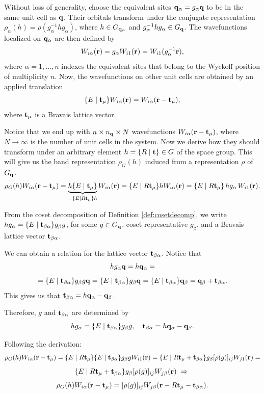 Without loss of generality, choose the equivalent sites ${\vb{q}}_\alpha = g_{\alpha} {\vb{q}}$ to be in the same unit cell as ${\vb{q}}$. Their orbitals transform under the conjugate representation $\rho_\alpha(h) = \rho(g_\alpha^{-1} h g_\alpha)$, where $h \in G_{{\vb{q}}_\alpha}$ and $g_\alpha^{-1} h g_\alpha \in G_{\vb{q}}$. The wavefunctions localized on ${\vb{q}}_\alpha$ are then defined by
$$
W_{i\alpha}({\vb{r}}) = g_\alpha W_{i1}({\vb{r}}) = W_{i1}(g_\alpha^{-1} {\vb{r}}),
$$
where $\alpha = 1, \ldots, n$ indexes the equivalent sites that belong to the Wyckoff position of multiplicity $n$. Now, the wavefunctions on other unit cells are obtained by an applied translation
$$
\{ E \mid {\vb{t}}_\mu \} W_{i\alpha}({\vb{r}}) = W_{i\alpha}({\vb{r}}-{\vb{t}}_\mu),
$$
where ${\vb{t}}_\mu$ is a Bravais lattice vector.

Notice that we end up with $n \times n_{\vb{q}} \times N$ wavefunctions $W_{i\alpha}({\vb{r}}-{\vb{t}}_\mu)$, where $N \to \infty$ is the number of unit cells in the system. Now we derive how they should transform under an arbitrary element $h = \{ R \mid {\vb{t}} \} \in G$ of the space group. This will give us the band representation $\rho_G(h)$ induced from a representation $\rho$ of $G_{\vb{q}}$.
$$
\rho_G(h) W_{i\alpha}({\vb{r}}-{\vb{t}}_\mu) =
\underbrace{h \{ E \mid {\vb{t}}_\mu \}}_{= \{ E \mid R{\vb{t}}_\mu \} h} W_{i\alpha} ({\vb{r}}) =
\{ E \mid R{\vb{t}}_\mu \} h W_{i\alpha} ({\vb{r}}) =
\{ E \mid R{\vb{t}}_\mu \} \, h g_\alpha \, W_{i1} ({\vb{r}}).
$$

From the coset decomposition of Definition \ref{def:cosetdecomp}, we write $h g_\alpha = \{ E \mid {\vb{t}}_{\beta\alpha} \} g_\beta g$, for some $g \in G_{\vb{q}}$, coset representative $g_\beta$, and a Bravais lattice vector ${\vb{t}}_{\beta\alpha}$.

We can obtain a relation for the lattice vector ${\vb{t}}_{\beta\alpha}$. Notice that
$$
h g_\alpha {\vb{q}} = h {\vb{q}}_\alpha =
$$
$$
= \{ E \mid {\vb{t}}_{\beta\alpha} \} g_\beta g {\vb{q}} = \{ E \mid {\vb{t}}_{\beta\alpha} \} g_\beta {\vb{q}} = \{ E \mid {\vb{t}}_{\beta\alpha} \} {\vb{q}}_\beta = {\vb{q}}_\beta + {\vb{t}}_{\beta\alpha}.
$$
This gives us that ${\vb{t}}_{\beta\alpha} = h {\vb{q}}_\alpha - {\vb{q}}_\beta$.

Therefore, $g$ and ${\vb{t}}_{\beta\alpha}$ are determined by
\begin{equation} \label{eq:g_and_tba}
h g_\alpha = \{ E \mid {\vb{t}}_{\beta\alpha} \} g_\beta g, \quad {\vb{t}}_{\beta\alpha} = h {\vb{q}}_\alpha - {\vb{q}}_\beta.
\end{equation}

Following the derivation:
$$
\rho_G(h) W_{i\alpha}({\vb{r}}-{\vb{t}}_\mu) =
\{ E \mid R{\vb{t}}_\mu \} \{ E \mid {\vb{t}}_{\beta\alpha} \} g_\beta g W_{i1}({\vb{r}}) =
\{ E \mid R{\vb{t}}_\mu + {\vb{t}}_{\beta\alpha} \} g_\beta [\rho(g)]_{ij} W_{j1}({\vb{r}}) =
$$
$$
\{ E \mid R{\vb{t}}_\mu + {\vb{t}}_{\beta\alpha} \} g_\beta [\rho(g)]_{ij} W_{j\beta}({\vb{r}}) \; \Rightarrow \;
$$
\begin{equation} \label{eq:wannier_rep}
\rho_G(h) W_{i\alpha}({\vb{r}}-{\vb{t}}_\mu) = [\rho(g)]_{ij} W_{j\beta}({\vb{r}} - R{\vb{t}}_\mu - {\vb{t}}_{\beta\alpha}).
\end{equation}

